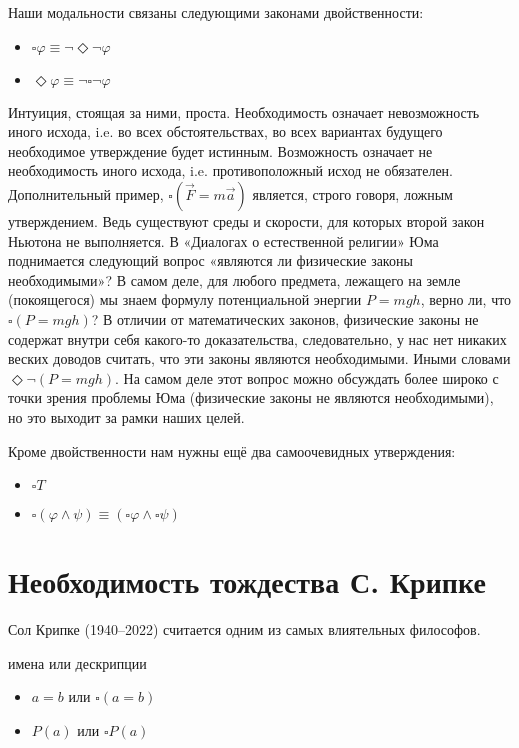 \documentclass[openany]{book}
\theoremstyle{plain}
\theoremstyle{definition}
\begin{document}
Наши модальности связаны следующими законами двойственности:
\begin{itemize}
\item \(\square \varphi \equiv \neg \Diamond \neg \varphi\)
\item \(\Diamond \varphi \equiv \neg \square \neg \varphi\)
\end{itemize}

Интуиция, стоящая за ними, проста. Необходимость означает невозможность иного исхода, i.e. во всех обстоятельствах, во всех вариантах будущего необходимое утверждение будет истинным. Возможность означает не необходимость иного исхода, i.e. противоположный исход не обязателен. Дополнительный пример, \(\square(\vec{F} = m \vec{a})\) является, строго говоря, ложным утверждением. Ведь существуют среды и скорости, для которых второй закон Ньютона не выполняется. В «Диалогах о естественной религии» Юма поднимается следующий вопрос «являются ли физические законы необходимыми»? В самом деле, для любого предмета, лежащего на земле (покоящегося) мы знаем формулу потенциальной энергии \(P = mgh\), верно ли, что \(\square(P = mgh)\)? В отличии от математических законов, физические законы не содержат внутри себя какого-то доказательства, следовательно, у нас нет никаких веских доводов считать, что эти законы являются необходимыми. Иными словами \(\Diamond \neg(P = mgh)\). На самом деле этот вопрос можно обсуждать более широко с точки зрения проблемы Юма (физические законы не являются необходимыми), но это выходит за рамки наших целей.

Кроме двойственности нам нужны ещё два самоочевидных утверждения:
\begin{itemize}
\item \(\square T\)
\item \(\square (\varphi \land \psi) \equiv (\square \varphi \land \square \psi)\)
\end{itemize}

\section{Необходимость тождества С. Крипке}

Сол Крипке (1940--2022) считается одним из самых влиятельных философов. 

имена или дескрипции
\begin{itemize}
\item \(a = b\) или \(\square(a = b)\)
\item \(P(a)\) или \(\square P(a)\)
\end{itemize}
\end{document}
